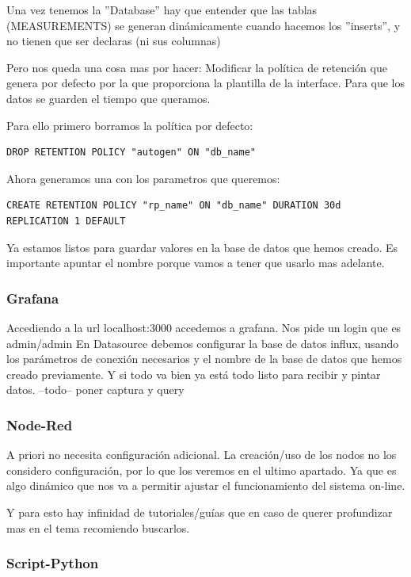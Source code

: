 \documentclass[12pt, a4paper, oneside, titlepage]{article}
\begin{document}
Una vez tenemos la ''Database'' hay que entender que las tablas (MEASUREMENTS) se generan dinámicamente cuando hacemos los ''inserts'', y no tienen que ser declaras (ni sus columnas) 
 
Pero nos queda una cosa mas por hacer: Modificar la política de retención que genera por defecto por la que proporciona la plantilla de la interface. Para que los datos se guarden el tiempo que queramos.

Para ello primero borramos la política por defecto:

\begin{lstlisting}
DROP RETENTION POLICY "autogen" ON "db_name"
\end{lstlisting}
Ahora generamos una con los parametros que queremos:

\begin{lstlisting}
CREATE RETENTION POLICY "rp_name" ON "db_name" DURATION 30d REPLICATION 1 DEFAULT
\end{lstlisting}

Ya estamos listos para guardar valores en la base de datos que hemos creado. Es importante apuntar el nombre porque vamos a tener que usarlo mas adelante.

\subsubsection{Grafana}


Accediendo a la url localhost:3000 accedemos a grafana. Nos pide un login que es admin/admin
En Datasource debemos configurar la base de datos influx, usando los parámetros de conexión necesarios y el nombre de la base de datos que hemos creado previamente. Y si todo va bien ya está todo listo para recibir y pintar datos.
--todo-- poner captura y query

\subsubsection{Node-Red}

A priori no necesita configuración adicional. La creación/uso de los nodos no los considero configuración, por lo que los veremos en el ultimo apartado. Ya que es algo dinámico que nos va a permitir ajustar el funcionamiento del sistema on-line.

Y para esto hay infinidad de tutoriales/guías que en caso de querer profundizar mas en el tema recomiendo buscarlos.

\subsubsection{Script-Python}
\end{document}
